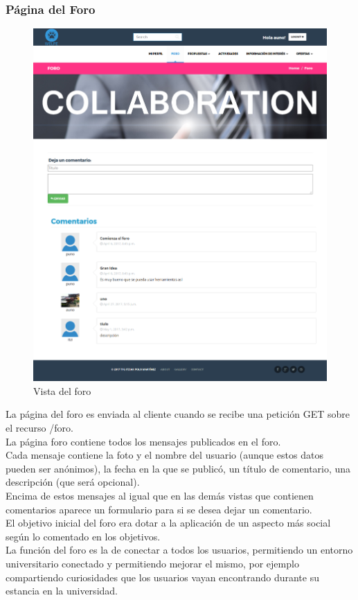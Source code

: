 \subsubsection{Página del Foro}
\label{subsubsec:foro}
\begin{figure}[H]
\centering
\includegraphics[width=12cm]{img/foro}
\caption{Vista del foro}
\label{figura:foro}
\end{figure}
La página del foro es enviada al cliente cuando se recibe una petición GET sobre el recurso /foro.\\
La página foro contiene todos los mensajes publicados en el foro.\\
Cada mensaje contiene la foto y el nombre del usuario (aunque estos datos pueden ser anónimos), la fecha en la que se publicó, un título de comentario, una descripción (que será opcional).\\
Encima de estos mensajes al igual que en las demás vistas que contienen comentarios aparece un formulario para si se desea dejar un comentario.\\
El objetivo inicial del foro era dotar a la aplicación de un aspecto más social según lo comentado en los objetivos.\\
La función del foro es la de conectar a todos los usuarios, permitiendo un entorno universitario conectado y permitiendo mejorar el mismo, por ejemplo compartiendo curiosidades que los usuarios vayan encontrando durante su estancia en la universidad.

